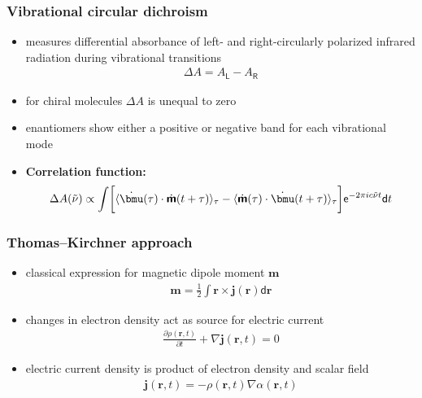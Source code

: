 \documentclass[t]{beamer}
\begin{document}
	\begin{frame}
	    \frametitle{Vibrational circular dichroism}
	    \begin{itemize}
	        \item measures differential absorbance of left- and right-circularly polarized infrared radiation during vibrational transitions
	        \begin{align*}
	            \Delta A = A_\mathsf{L} - A_\mathsf{R}
	        \end{align*}
	        \item for chiral molecules $\Delta A$ is unequal to zero
	        \item enantiomers show either a positive or negative band for each vibrational mode
	        \item \textbf{Correlation function:} 
			\begin{align*}
				\Delta A (\tilde{\nu}) \propto \int \biggl[\langle \dot{\bmu} (\tau) \cdot \dot{\boldsymbol{\mathsf{m}}} (t + \tau) \rangle_{\tau} - \langle \dot{\boldsymbol{\mathsf{m}}} (\tau) \cdot \dot{\bmu} (t + \tau) \rangle_{\tau} \biggl] \mathsf{e}^{-2\pi i c \tilde{\nu} t}\mathsf{d}t
			\end{align*}
	    \end{itemize}
	\end{frame}
	\begin{frame}
	    \frametitle{Thomas--Kirchner approach}
	    \begin{itemize}
	        \item classical expression for magnetic dipole moment $\mathbf{m}$
	        \begin{align*}
	            \mathbf{m} = \frac{1}{2} \int \mathbf{r} \times \mathbf{j}(\mathbf{r}) \mathsf{d}\mathbf{r}
	        \end{align*}
	        
	        \item changes in electron density act as source for electric current
	        \begin{align*}
	            \frac{\partial \rho (\mathbf{r},t)}{\partial t} + \nabla \mathbf{j}(\mathbf{r},t) = 0
	        \end{align*}
	        
	        \item electric current density is product of electron density and scalar field
	        \begin{align*} 
	        \mathbf{j}(\mathbf{r},t) = -\rho (\mathbf{r},t) \nabla \alpha(\mathbf{r},t)
			\end{align*}
	    \end{itemize}
	\end{frame}
\end{document}
